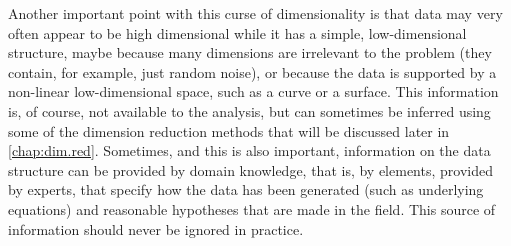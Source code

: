 Another important point with this curse of dimensionality is that data may very often appear to be high dimensional while it has a simple, low-dimensional structure, maybe because many dimensions are irrelevant to the problem (they contain, for example, just random noise), or because the data is supported by a non-linear low-dimensional space, such as a curve or a surface. This information is, of course, not available to the analysis, but can sometimes be inferred using some of the dimension reduction methods that will be discussed later in \cref{chap:dim.red}. Sometimes, and this is also important, information on the data structure can be provided by domain knowledge, that is, by elements, provided by experts, that specify how the data has been generated (such as underlying equations) and reasonable hypotheses that are made in the field. This source of information should never be ignored in practice.



